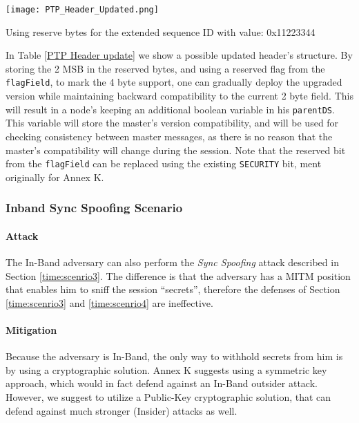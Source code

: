 \documentclass[11pt]{article}
\begin{document}
\begin{table}[t]

\centerline{\texttt{[image: PTP\_Header\_Updated.png]}}
\caption{Using reserve bytes for the extended sequence ID with value: 0x11223344}
\label{PTP Header update}

\end{table}

In Table \ref{PTP Header update} we show a possible updated header's structure. By storing the 2 MSB in the reserved bytes, and using a reserved flag from the \texttt{flagField}, to mark the 4 byte support, one can gradually deploy the upgraded version while maintaining backward compatibility to the current 2 byte field. This will result in a node's keeping an additional boolean variable in his \texttt{parentDS}. This variable will store the master's version compatibility, and will be used for checking consistency between master messages, as there is no reason that the master's compatibility will change during the session. Note that the reserved bit from the \texttt{flagField} can be replaced using the existing \texttt{SECURITY} bit, ment originally for Annex K.



\subsubsection{Inband Sync Spoofing Scenario}\label{time:scenrio5}

\paragraph{Attack}

The In-Band adversary can also perform the \emph{Sync Spoofing} attack described in Section \ref{time:scenrio3}. The difference is that the adversary has a MITM position that enables him to sniff the session ``secrets'', therefore the defenses of Section \ref{time:scenrio3} and \ref{time:scenrio4} are ineffective.



\paragraph{Mitigation}\label{time:scenrio5mit}

Because the adversary is In-Band, the only way to withhold secrets from him is by using a cryptographic solution. Annex K suggests using a symmetric key approach, which would in fact defend against an In-Band outsider attack. However, we suggest to utilize a Public-Key cryptographic solution, that can defend against much stronger (Insider) attacks as well.
\end{document}
